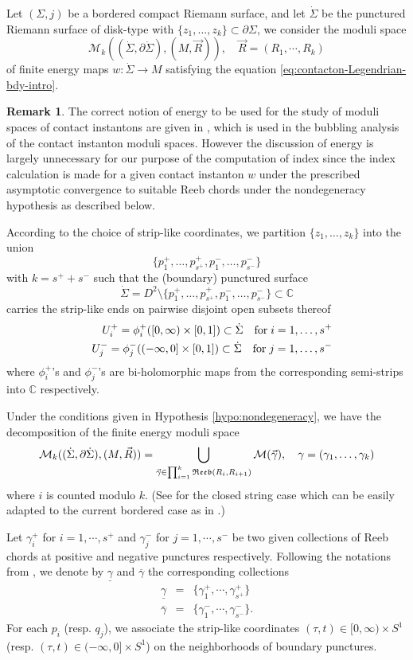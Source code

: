 \documentclass[reqno]{amsart}
\def\C{\ifmmode{\mathbb C}\else{$\mathbb C$}\fi} %
\newcommand{\del}{\partial}
\newcommand{\beastar}{\begin{eqnarray*}}
\newcommand{\eeastar}{\end{eqnarray*}}
\theoremstyle{theorem}
\theoremstyle{definition}
\newtheorem{rem}[thm]{Remark}
\numberwithin{equation}{section}
\def\C{{\mathbb C}}
\def\C{\mathbb{C}}
\def\C{\ifmmode{\mathbb C}\else{$\mathbb C$}\fi} %
\def\C{{\mathbb C}}
\def\CM{{\mathcal M}}
\begin{document}
Let $(\Sigma, j)$ be a bordered compact Riemann surface, and let $\dot \Sigma$ be the
punctured Riemann surface of disk-type with $\{z_1,\ldots, z_k \} \subset \del \Sigma$, we consider the moduli space
$$
\CM_k((\dot \Sigma,\del \dot \Sigma),(M,\vec R)), \quad \vec R = (R_1,\cdots, R_k)
$$
 of finite energy maps $w: \dot \Sigma \to M$ satisfying the equation
\eqref{eq:contacton-Legendrian-bdy-intro}.
\begin{rem} The correct notion of energy to be used for the study of moduli
spaces of contact instantons are given in \cite{oh:contacton}, \cite{oh:entanglement1}
which is used in the bubbling analysis of the contact instanton moduli spaces.
However the discussion of energy is largely unnecessary for our purpose of the computation of
index since the index calculation is made for a given contact instanton $w$ under the prescribed asymptotic
convergence to suitable Reeb chords under the nondegeneracy hypothesis as described below.
\end{rem}

According to the choice of strip-like coordinates,
we partition $\{z_1,\ldots, z_k \}$ into the union
$$
\{p^+_1,\ldots,p^+_{s^+},p^-_1,\ldots,p^-_{s^-}\}
$$
with $k = s^+ + s^-$ such that the (boundary) punctured surface
$$
\dot \Sigma = D^2 \setminus \{p^+_1,\ldots,p^+_{s^+},p^-_1,\ldots,p^-_{s^-}\} \subset \C
$$
carries the strip-like ends on pairwise disjoint open subsets thereof
\beastar
& &U_i^+ = \phi_i^+([0,\infty)\times[0,1])\subset \dot \Sigma \quad {\rm for} \; i=1,\ldots,s^+ \\
& &U_j^- = \phi_j^-((-\infty,0]\times[0,1])\subset \dot \Sigma \quad {\rm for} \; j=1,\ldots,s^-
\eeastar
where $\phi_i^+$'s and $\phi_j^-$'s are bi-holomorphic maps from the corresponding semi-strips into $\C$ respectively.

Under the conditions given in Hypothesis \ref{hypo:nondegeneracy},
we have the decomposition of the finite energy moduli space
$$
\CM_k((\dot \Sigma,\del \dot \Sigma),(M,\vec R)) =
\bigcup_{\vec \gamma \in \prod_{i=1}^{k}\frak{Reeb}(R_i,R_{i+1})} \CM(\vec \gamma),
\quad \gamma = (\gamma_1, \ldots, \gamma_k)
$$
where $i$ is counted modulo $k$. (See \cite{oh:contacton} for the closed
string case which can be easily adapted to the current bordered case as in
\cite{oh:entanglement1}.)

Let $\gamma^+_i$ for $i =1, \cdots, s^+$ and $\gamma^-_j$ for $j = 1, \cdots, s^-$
be two given collections of Reeb chords at positive and negative punctures
respectively. Following the notations from \cite{behwz},
we denote by $\underline \gamma$ and $\overline \gamma$ the corresponding
collections
\beastar
\underline \gamma & = & \{\gamma_1^+,\cdots, \gamma^+_{s^+}\} \\
\overline \gamma & = & \{\gamma_1^-,\cdots, \gamma^-_{s^-}\}.
\eeastar
For each $p_i$ (resp. $q_j$), we associate the strip-like
coordinates $(\tau,t) \in [0,\infty) \times S^1$ (resp. $(\tau,t) \in (-\infty,0] \times S^1$)
on the neighborhoods of boundary punctures.
\end{document}
